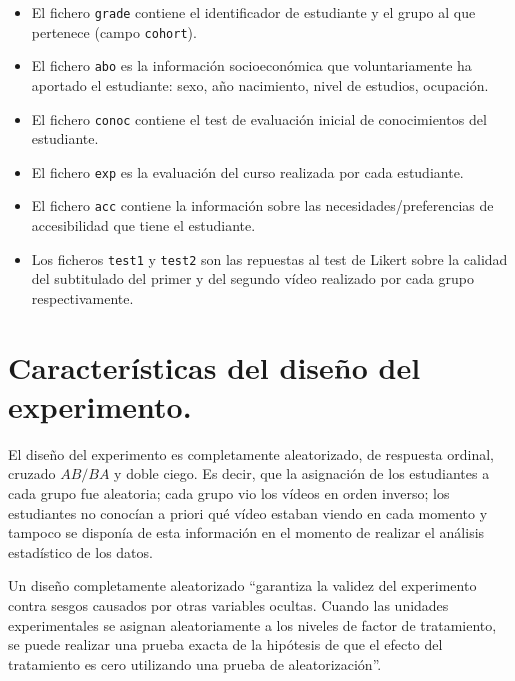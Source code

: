 \documentclass[
  12pt,
  a4paper,
  extrafontsizes,
  onecolumn,
  openright]{memoir}
\providecommand{\tightlist}{%
  \setlength{\itemsep}{0pt}\setlength{\parskip}{0pt}}\usepackage{longtable,booktabs,array}
\begin{document}
\begin{itemize}
\tightlist
\item
  El fichero \texttt{grade} contiene el identificador de estudiante y el
  grupo al que pertenece (campo \texttt{cohort}).
\item
  El fichero \texttt{abo} es la información socioeconómica que
  voluntariamente ha aportado el estudiante: sexo, año nacimiento, nivel
  de estudios, ocupación.
\item
  El fichero \texttt{conoc} contiene el test de evaluación inicial de
  conocimientos del estudiante.
\item
  El fichero \texttt{exp} es la evaluación del curso realizada por cada
  estudiante.
\item
  El fichero \texttt{acc} contiene la información sobre las
  necesidades/preferencias de accesibilidad que tiene el estudiante.
\item
  Los ficheros \texttt{test1} y \texttt{test2} son las repuestas al test
  de Likert sobre la calidad del subtitulado del primer y del segundo
  vídeo realizado por cada grupo respectivamente.
\end{itemize}

\hypertarget{sec-diseno}{%
\section{Características del diseño del experimento.}\label{sec-diseno}}

El diseño del experimento es completamente aleatorizado, de respuesta
ordinal, cruzado \(AB/BA\) y doble ciego. Es decir, que la asignación de
los estudiantes a cada grupo fue aleatoria; cada grupo vio los vídeos en
orden inverso; los estudiantes no conocían a priori qué vídeo estaban
viendo en cada momento y tampoco se disponía de esta información en el
momento de realizar el análisis estadístico de los datos.

Un diseño completamente aleatorizado \autocite[pp.~18]{lawson2015}
\enquote{garantiza la validez del experimento contra sesgos causados por
otras variables ocultas. Cuando las unidades experimentales se asignan
aleatoriamente a los niveles de factor de tratamiento, se puede realizar
una prueba exacta de la hipótesis de que el efecto del tratamiento es
cero utilizando una prueba de aleatorización}.
\end{document}
